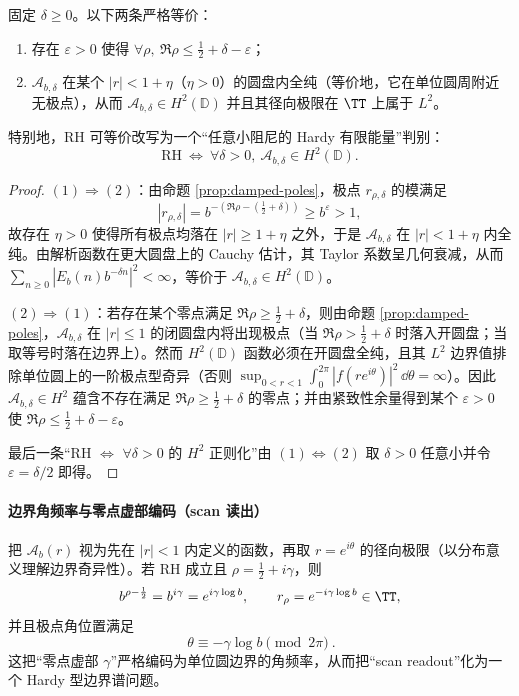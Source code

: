 \begin{theorem}\label{thm:hardy-criterion-delta}
固定 \(\delta\ge 0\)。以下两条严格等价：
\begin{enumerate}
\item 存在 \(\varepsilon>0\) 使得 \(\forall\rho,\ \Re\rho\le \tfrac12+\delta-\varepsilon\)；
\item \(\mathcal A_{b,\delta}\) 在某个 \(|r|<1+\eta\)（\(\eta>0\)）的圆盘内全纯（等价地，它在单位圆周附近无极点），从而 \(\mathcal A_{b,\delta}\in H^2(\mathbb D)\) 并且其径向极限在 \(\TT\) 上属于 \(L^2\)。
\end{enumerate}
特别地，RH 可等价改写为一个“任意小阻尼的 Hardy 有限能量”判别：
\[
\boxed{\ \mathrm{RH}\ \Longleftrightarrow\ \forall\delta>0,\ \mathcal A_{b,\delta}\in H^2(\mathbb D).\ }
\]
\end{theorem}
\begin{proof}
\((1)\Rightarrow(2)\)：由命题 \ref{prop:damped-poles}，极点 \(r_{\rho,\delta}\) 的模满足
\[
|r_{\rho,\delta}|=b^{-(\Re\rho-(\frac12+\delta))}\ge b^{\varepsilon}>1,
\]
故存在 \(\eta>0\) 使得所有极点均落在 \(|r|\ge 1+\eta\) 之外，于是 \(\mathcal A_{b,\delta}\) 在 \(|r|<1+\eta\) 内全纯。由解析函数在更大圆盘上的 Cauchy 估计，其 Taylor 系数呈几何衰减，从而 \(\sum_{n\ge 0}|E_b(n)b^{-\delta n}|^2<\infty\)，等价于 \(\mathcal A_{b,\delta}\in H^2(\mathbb D)\)。

\((2)\Rightarrow(1)\)：若存在某个零点满足 \(\Re\rho\ge \tfrac12+\delta\)，则由命题 \ref{prop:damped-poles}，\(\mathcal A_{b,\delta}\) 在 \(|r|\le 1\) 的闭圆盘内将出现极点（当 \(\Re\rho>\tfrac12+\delta\) 时落入开圆盘；当取等号时落在边界上）。然而 \(H^2(\mathbb D)\) 函数必须在开圆盘全纯，且其 \(L^2\) 边界值排除单位圆上的一阶极点型奇异（否则 \(\sup_{0<r<1}\int_0^{2\pi}|f(re^{i\theta})|^2\,\dd\theta=\infty\)）。因此 \(\mathcal A_{b,\delta}\in H^2\) 蕴含不存在满足 \(\Re\rho\ge \tfrac12+\delta\) 的零点；并由紧致性余量得到某个 \(\varepsilon>0\) 使 \(\Re\rho\le\tfrac12+\delta-\varepsilon\)。

最后一条“RH \(\Leftrightarrow\) \(\forall\delta>0\) 的 \(H^2\) 正则化”由 \((1)\Leftrightarrow(2)\) 取 \(\delta>0\) 任意小并令 \(\varepsilon=\delta/2\) 即得。
\end{proof}

\paragraph{边界角频率与零点虚部编码（scan 读出）}
把 \(\mathcal A_b(r)\) 视为先在 \(|r|<1\) 内定义的函数，再取 \(r=e^{i\theta}\) 的径向极限（以分布意义理解边界奇异性）。若 RH 成立且 \(\rho=\tfrac12+i\gamma\)，则
\[
b^{\rho-\frac12}=b^{i\gamma}=e^{i\gamma\log b},
\qquad
r_\rho=e^{-i\gamma\log b}\in\TT,
\]
并且极点角位置满足
\[
\boxed{\ \theta\equiv -\gamma\log b\pmod{2\pi}\ }.
\]
这把“零点虚部 \(\gamma\)”严格编码为单位圆边界的角频率，从而把“scan readout”化为一个 Hardy 型边界谱问题。

